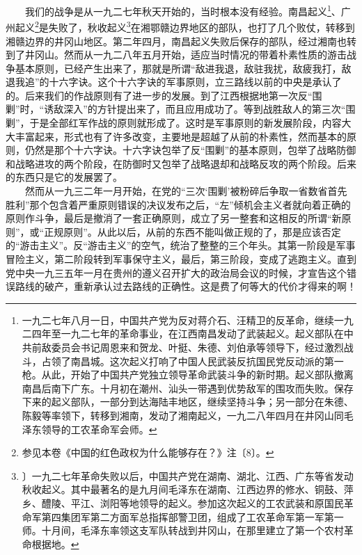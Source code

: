\documentclass[cn,11pt,chinese]{elegantbook}
\begin{document}
　　我们的战争是从一九二七年秋天开始的，当时根本没有经验。南昌起义\footnote[37]{ 一九二七年八月一日，中国共产党为反对蒋介石、汪精卫的反革命，继续一九二四年至一九二七年的革命事业，在江西南昌发动了武装起义。起义部队在中共前敌委员会书记周恩来和贺龙、叶挺、朱德、刘伯承等领导下，经过激烈战斗，占领了南昌城。这次起义打响了中国人民武装反抗国民党反动派的第一枪。从此，开始了中国共产党独立领导革命武装斗争的新时期。起义部队撤离南昌后南下广东。十月初在潮州、汕头一带遇到优势敌军的围攻而失败。保存下来的起义部队，一部分到达海陆丰地区，继续坚持斗争；另一部分在朱德、陈毅等率领下，转移到湘南，发动了湘南起义，一九二八年四月在井冈山同毛泽东领导的工农革命军会师。}、广州起义\footnote[38]{ 参见本卷《中国的红色政权为什么能够存在？》注〔8〕。}是失败了，秋收起义\footnote[39]{ 〕一九二七年革命失败以后，中国共产党在湖南、湖北、江西、广东等省发动秋收起义。其中最著名的是九月间毛泽东在湖南、江西边界的修水、铜鼓、萍乡、醴陵、平江、浏阳等地领导的起义。参加这次起义的工农武装和原国民革命军第四集团军第二方面军总指挥部警卫团，组成了工农革命军第一军第一师。十月间，毛泽东率领这支军队转战到井冈山，在那里建立了第一个农村革命根据地。}在湘鄂赣边界地区的部队，也打了几个败仗，转移到湘赣边界的井冈山地区。第二年四月，南昌起义失败后保存的部队，经过湘南也转到了井冈山。然而从一九二八年五月开始，适应当时情况的带着朴素性质的游击战争基本原则，已经产生出来了，那就是所谓“敌进我退，敌驻我扰，敌疲我打，敌退我追”的十六字诀。这个十六字诀的军事原则，立三路线以前的中央是承认了的。后来我们的作战原则有了进一步的发展。到了江西根据地第一次反“围剿”时，“诱敌深入”的方针提出来了，而且应用成功了。等到战胜敌人的第三次“围剿”，于是全部红军作战的原则就形成了。这时是军事原则的新发展阶段，内容大大丰富起来，形式也有了许多改变，主要地是超越了从前的朴素性，然而基本的原则，仍然是那个十六字诀。十六字诀包举了反“围剿”的基本原则，包举了战略防御和战略进攻的两个阶段，在防御时又包举了战略退却和战略反攻的两个阶段。后来的东西只是它的发展罢了。\\
　　然而从一九三二年一月开始，在党的“三次‘围剿’被粉碎后争取一省数省首先胜利”那个包含着严重原则错误的决议发布之后，“左”倾机会主义者就向着正确的原则作斗争，最后是撤消了一套正确原则，成立了另一整套和这相反的所谓“新原则”，或“正规原则”。从此以后，从前的东西不能叫做正规的了，那是应该否定的“游击主义”。反“游击主义”的空气，统治了整整的三个年头。其第一阶段是军事冒险主义，第二阶段转到军事保守主义，最后，第三阶段，变成了逃跑主义。直到党中央一九三五年一月在贵州的遵义召开扩大的政治局会议的时候，才宣告这个错误路线的破产，重新承认过去路线的正确性。这是费了何等大的代价才得来的啊！\\
\end{document}
